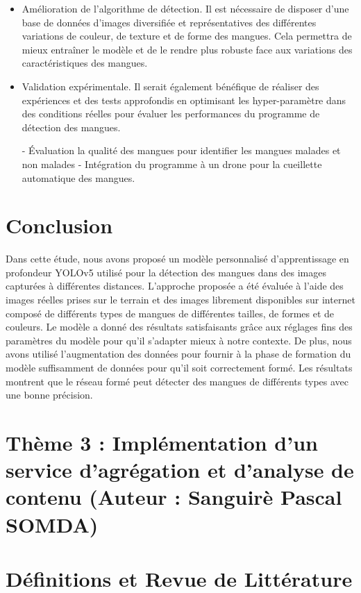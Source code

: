 \documentclass{article}
\begin{document}
	\begin{itemize}
		\item Amélioration de l’algorithme de détection.
		Il est nécessaire de disposer d’une base de données d’images
		diversifiée et représentatives des différentes variations de couleur, de texture et de forme des mangues.
		Cela permettra de mieux entraîner le modèle et de le rendre plus robuste face aux variations des
		caractéristiques des mangues.
		\item Validation expérimentale.
		Il serait également bénéfique de réaliser des expériences et des tests approfondis en optimisant les hyper-paramètre dans des conditions réelles pour évaluer les performances du programme de
		détection des mangues.
		
		- Évaluation la qualité des mangues pour identifier les mangues malades et non malades
		- Intégration du programme à un drone pour la cueillette automatique des mangues. 
	\end{itemize}
	
	\section{Conclusion}
	Dans cette étude, nous avons proposé un modèle personnalisé d’apprentissage en profondeur
	YOLOv5 utilisé pour la détection des mangues dans des images capturées à différentes distances.
	L’approche proposée a été évaluée à l’aide des images réelles prises sur le terrain et des images
	librement disponibles sur internet composé de différents types de mangues de différentes tailles,
	de formes et de couleurs. Le modèle a donné des résultats satisfaisants grâce aux réglages fins
	des paramètres du modèle pour qu’il s’adapter mieux à notre contexte. De plus, nous avons utilisé
	l’augmentation des données pour fournir à la phase de formation du modèle suffisamment de données
	pour qu’il soit correctement formé. Les résultats montrent que le réseau formé peut détecter des
	mangues de différents types avec une bonne précision.
	
	
	\section{Thème 3 : Implémentation d’un service d’agrégation et
		d’analyse de contenu (Auteur : Sanguirè Pascal SOMDA)}
	\section{Définitions et Revue de Littérature}
	
\end{document}

